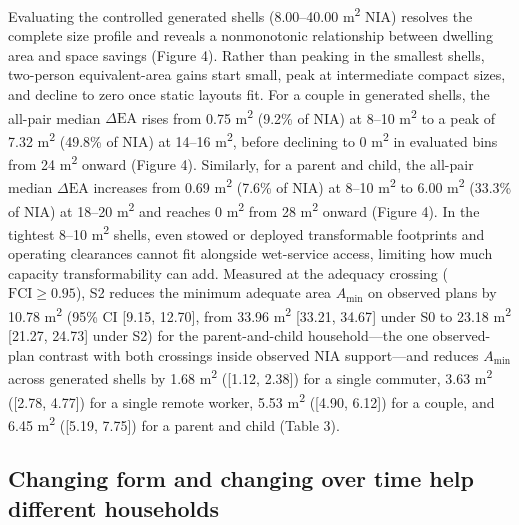 \documentclass[12pt,letterpaper]{article}
\begin{document}
Evaluating the controlled generated shells (8.00--40.00 m\textsuperscript{2} NIA) resolves the complete size profile and reveals a nonmonotonic relationship between dwelling area and space savings (Figure 4). Rather than peaking in the smallest shells, two-person equivalent-area gains start small, peak at intermediate compact sizes, and decline to zero once static layouts fit. For a couple in generated shells, the all-pair median \(\Delta\text{EA}\) rises from 0.75 m\textsuperscript{2} (9.2\% of NIA) at 8--10 m\textsuperscript{2} to a peak of 7.32 m\textsuperscript{2} (49.8\% of NIA) at 14--16 m\textsuperscript{2}, before declining to 0 m\textsuperscript{2} in evaluated bins from 24 m\textsuperscript{2} onward (Figure 4). Similarly, for a parent and child, the all-pair median \(\Delta\text{EA}\) increases from 0.69 m\textsuperscript{2} (7.6\% of NIA) at 8--10 m\textsuperscript{2} to 6.00 m\textsuperscript{2} (33.3\% of NIA) at 18--20 m\textsuperscript{2} and reaches 0 m\textsuperscript{2} from 28 m\textsuperscript{2} onward (Figure 4). In the tightest 8--10 m\textsuperscript{2} shells, even stowed or deployed transformable footprints and operating clearances cannot fit alongside wet-service access, limiting how much capacity transformability can add. Measured at the adequacy crossing (\(\text{FCI} \ge 0.95\)), S2 reduces the minimum adequate area \(A_{\min}\) on observed plans by 10.78 m\textsuperscript{2} (95\% CI {[}9.15, 12.70{]}, from 33.96 m\textsuperscript{2} {[}33.21, 34.67{]} under S0 to 23.18 m\textsuperscript{2} {[}21.27, 24.73{]} under S2) for the parent-and-child household---the one observed-plan contrast with both crossings inside observed NIA support---and reduces \(A_{\min}\) across generated shells by 1.68 m\textsuperscript{2} ({[}1.12, 2.38{]}) for a single commuter, 3.63 m\textsuperscript{2} ({[}2.78, 4.77{]}) for a single remote worker, 5.53 m\textsuperscript{2} ({[}4.90, 6.12{]}) for a couple, and 6.45 m\textsuperscript{2} ({[}5.19, 7.75{]}) for a parent and child (Table 3).

\subsection{Changing form and changing over time help different households}\label{changing-form-and-changing-over-time-help-different-households}
\end{document}
